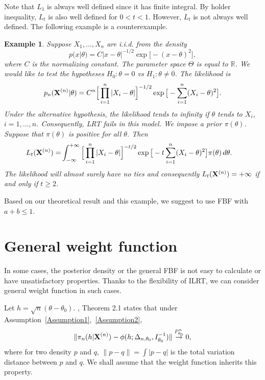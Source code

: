 \documentclass[3p]{elsarticle}
\theoremstyle{plain}
\newtheorem{example}{Example}
\theoremstyle{definition}
\theoremstyle{remark}
\begin{document}
Note that $L_1$ is always well defined since it has finite integral.
By holder inequality, $L_{t}$ is also well defined for $0<t<1$.
However, $L_t$ is not always well defined.
The following example is a counterexample.

\begin{example}
Suppose $X_1,\ldots,X_n$ are i.i.d. from the density
$$
    p(x|\theta)=C |x-\theta|^{-1/2}\exp\big[-(x-\theta)^2\big]
,
$$
    where $C$ is the normalizing constant. The parameter space $\Theta$ is equal to $\mathbb{R}$.
    We would like to test the hypotheses $H_0:\theta=0$ vs $H_1:\theta\neq 0$.
    The likelihood is
    $$
    p_n(\mathbf{X}^{(n)}|\theta)=C^n \Big[\prod_{i=1}^n |X_i-\theta|\Big]^{-1/2}
    \exp \big[-\sum_{i=1}^n (X_i-\theta)^2 \big].
    $$
    Under the alternative hypothesis, the likelihood tends to infinity if $\theta$ tends to $X_i$, $i=1,\ldots, n$.
    Consequently, LRT fails in this model.
    We impose a prior $\pi(\theta)$.
    Suppose that $\pi(\theta)$ is positive for all $\theta$.
Then
$$
    \begin{aligned}
        L_t(\mathbf{X}^{(n)})=&
    \int_{-\infty}^{+\infty}
\Big[\prod_{i=1}^n |X_i-\theta|\Big]^{-t/2}
    \exp \big[-t\sum_{i=1}^n (X_i-\theta)^2 \big]
        \pi(\theta)
    \,
    d \theta.
    \end{aligned}
$$
    The likelihood will almost surely have no ties and consequently $L_t(\mathbf{X}^{(n)})=+\infty$ if and only if $t\geq 2$.
\end{example}

Based on our theoretical result and this example, we suggest to use FBF with $a+b\leq 1$.


\section{General weight function}


In some cases, the posterior density or the general FBF is not easy to calculate or have unsatisfactory properties.
Thanks to the flexibility of ILRT, we can consider general weight function in such cases.

Let $h=\sqrt{n}(\theta-\theta_0)$. \cite{Kleijn2012The}, Theorem 2.1 states that
under Assumption~\ref{Assumption1},~\ref{Assumption2},
$$
            \|\pi_n(h|\mathbf{X}^{(n)})-\phi(h;\Delta_{n,\theta_0},I_{\theta_0}^{-1})\|\overset{P_{\theta_0}^n}{\to}0,
$$
where for two density $p$ and $q$, $\|p-q\|=\int |p-q|$ is the total variation distance between $p$ and $q$.
We shall assume that the weight function inherits this property.
        
\end{document}
